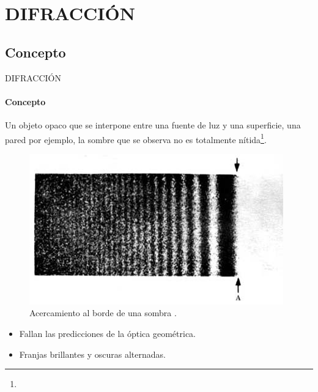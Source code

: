 
\section{DIFRACCIÓN}
\subsection{Concepto}

\begin{frame}{DIFRACCIÓN}
    \framesubtitle{Concepto}
    Un objeto opaco que se interpone entre una fuente de luz y una superficie, una pared por ejemplo, la sombre que se observa no es totalmente nítida\footnote{}.
    \begin{figure}[H]
		\centering
		\includegraphics[scale=1]{david/Shadow.jpg}
		\caption{Acercamiento al borde de una sombra \footnotemark{}.}
	\end{figure}
    \begin{itemize}
        \item Fallan las predicciones de la óptica geométrica.
        \item Franjas brillantes y oscuras alternadas.
    \end{itemize}
    \vspace{-5mm}
\end{frame}

